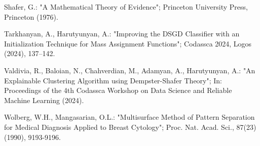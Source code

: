 \documentclass[10pt,a4paper,oneside]{article}
\begin{document}
\begin{thebibliography}{}
{
Shafer, G.: "A Mathematical Theory of Evidence";
Princeton University Press, Princeton (1976).

Tarkhanyan, A., Harutyunyan, A.:
"Improving the DSGD Classifier with an Initialization Technique for Mass Assignment Functions";
Codassca 2024, Logos (2024), 137–142.

Valdivia, R., Baloian, N., Chahverdian, M., Adamyan, A., Harutyunyan, A.:
"An Explainable Clustering Algorithm using Dempster-Shafer Theory";
In: Proceedings of the 4th Codassca Workshop on Data Science and Reliable Machine Learning (2024).

Wolberg, W.H., Mangasarian, O.L.: "Multisurface Method of Pattern Separation for Medical Diagnosis Applied to Breast Cytology";
Proc. Nat. Acad. Sci., 87(23) (1990), 9193-9196.

}\end{thebibliography}
\end{document}
